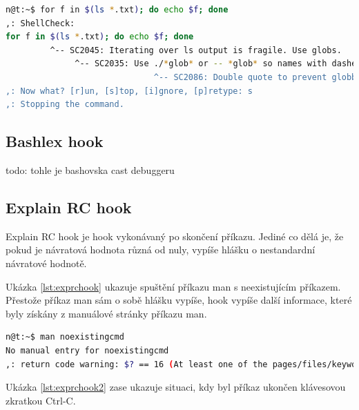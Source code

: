 \documentclass[thesis=M,czech]{FITthesis}[2012/06/26]
\begin{document}
\begin{minipage}{\linewidth}
\begin{lstlisting}[language=bash, caption={ShellCheck}, label={lst:csfor}]
n@t:~$ for f in $(ls *.txt); do echo $f; done
,: ShellCheck: 
for f in $(ls *.txt); do echo $f; done
         ^-- SC2045: Iterating over ls output is fragile. Use globs.
              ^-- SC2035: Use ./*glob* or -- *glob* so names with dashes won't become options.
                              ^-- SC2086: Double quote to prevent globbing and word splitting.
,: Now what? [r]un, [s]top, [i]gnore, [p]retype: s
,: Stopping the command.

\end{lstlisting}
\end{minipage}







\subsection{Bashlex hook}
todo: tohle je bashovska cast debuggeru

\subsection{Explain RC hook}

Explain RC hook je hook vykonávaný po skončení příkazu. Jediné co dělá je, že pokud je návratová hodnota různá od nuly, vypíše hlášku o nestandardní návratové hodnotě.

Ukázka \ref{lst:exprchook} ukazuje spuštění příkazu man s neexistujícím příkazem. Přestože příkaz man sám o sobě hlášku vypíše, hook vypíše další informace, které byly získány z manuálové stránky příkazu man.

\begin{minipage}{\linewidth}
\begin{lstlisting}[language=bash, caption={Explain RC hook}, label={lst:exprchook}]
n@t:~$ man noexistingcmd
No manual entry for noexistingcmd
,: return code warning: $? == 16 (At least one of the pages/files/keywords didn't exist or wasn't matched.)
\end{lstlisting}
\end{minipage}

Ukázka \ref{lst:exprchook2} zase ukazuje situaci, kdy byl příkaz ukončen klávesovou zkratkou Ctrl-C.
\end{document}

